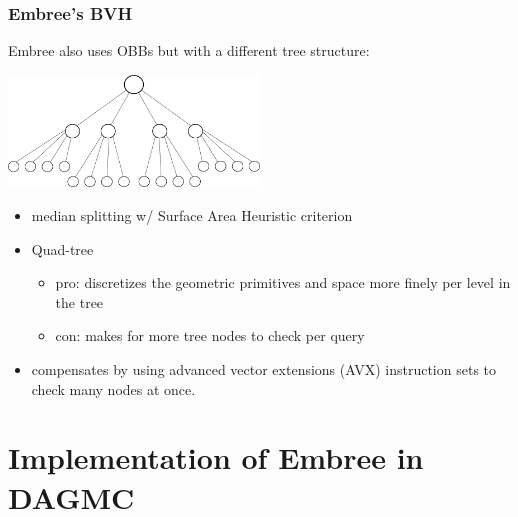 \documentclass[12pt]{beamer}
\begin{document}
\begin{frame}

\frametitle{Embree's BVH}

Embree \cite{embree} also uses OBBs but with a different tree structure:

\begin{center}
\includegraphics[width=0.5\textwidth]{quad_tree.png}
\end{center}

\begin{itemize}
\item median splitting w/ Surface Area Heuristic \cite{sah} criterion 
\item Quad-tree
  \begin{itemize}
  \item pro: discretizes the geometric primitives and space more finely per level in the tree
  \item con: makes for more tree nodes to check per query
  \end{itemize}
\item compensates by using advanced vector extensions (AVX) instruction sets to check many nodes at once.
\end{itemize}

\end{frame}


\section{Implementation of Embree in DAGMC} %
\end{document}

